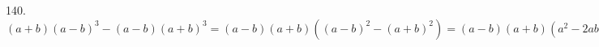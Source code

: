 140. $(a+b)(a-b)^3-(a-b)(a+b)^3=(a-b)(a+b)((a-b)^2-(a+b)^2)=(a-b)(a+b)(a^2-2ab+b^2-a^2-2ab-b^2)=4ab(b-a)(a+b).$\\
